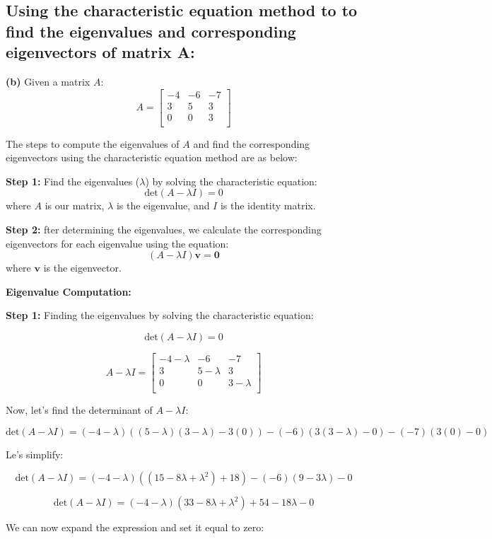 \documentclass{article}
\begin{document}
\subsection*{Using the characteristic equation method to to find the eigenvalues and corresponding eigenvectors of matrix A:}
\textbf{(b)} Given a matrix \(A\):
\[
A =
\begin{bmatrix}
-4 & -6 & -7 \\
3 & 5 & 3 \\
0 & 0 & 3 \\
\end{bmatrix}
\]

The steps to compute the eigenvalues of \(A\) and find the corresponding eigenvectors using the characteristic equation method are as below:

\textbf{Step 1:} Find the eigenvalues (\(\lambda\)) by solving the characteristic equation:
\[
\text{det}(A - \lambda I) = 0
\]
where \(A\) is our matrix, \(\lambda\) is the eigenvalue, and \(I\) is the identity matrix.

\textbf{Step 2:} fter determining the eigenvalues, we calculate the corresponding eigenvectors for each eigenvalue using the equation:
\[
(A - \lambda I) \mathbf{v} = \mathbf{0}
\]
where \(\mathbf{v}\) is the eigenvector.

\textbf{Eigenvalue Computation:}

\textbf{Step 1:} Finding the eigenvalues by solving the characteristic equation:

\[
\text{det}(A - \lambda I) = 0
\]

\[
A - \lambda I =
\begin{bmatrix}
-4-\lambda & -6 & -7 \\
3 & 5-\lambda & 3 \\
0 & 0 & 3-\lambda \\
\end{bmatrix}
\]

Now, let's find the determinant of \(A - \lambda I\):

\[
\text{det}(A - \lambda I) = (-4-\lambda)((5-\lambda)(3-\lambda) - 3(0)) - (-6)(3(3-\lambda) - 0) - (-7)(3(0) - 0)
\]

Le's simplify:

\[
\text{det}(A - \lambda I) = (-4-\lambda)((15 - 8\lambda + \lambda^2) + 18) - (-6)(9 - 3\lambda) - 0
\]

\[
\text{det}(A - \lambda I) = (-4-\lambda)(33 - 8\lambda + \lambda^2) + 54 - 18\lambda - 0
\]

We can now expand the expression and set it equal to zero:
\end{document}
